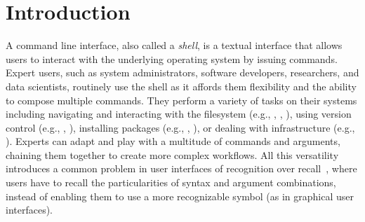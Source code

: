 \section{Introduction}

A command line interface, also called a \emph{shell}, is a textual interface that allows users to interact with the underlying operating system by issuing commands.
Expert users, such as system administrators, software developers, researchers, and data scientists, routinely use the shell as it affords them flexibility and the ability to compose multiple commands.
They perform a variety of tasks on their systems including navigating and interacting with the filesystem (e.g., , , ), using version control (e.g., , ), installing packages (e.g., , ), or dealing with infrastructure (e.g., ).
Experts can adapt and play with a multitude of commands and arguments, chaining them together to create more complex workflows.
All this versatility introduces a common problem in user interfaces of recognition over recall~\cite{nielsen:05}, where users have to recall the particularities of syntax and argument combinations, instead of enabling them to use a more recognizable symbol (as in graphical user interfaces).

